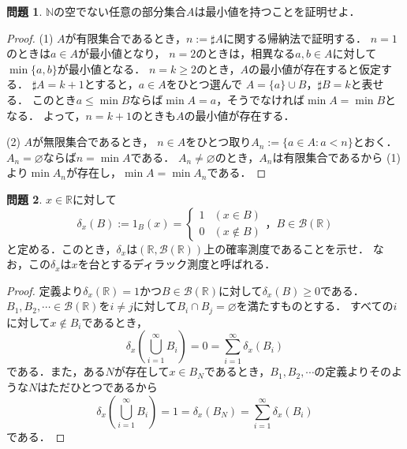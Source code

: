 \documentclass{jsarticle}
\theoremstyle{definition}
\newtheorem{qst}{問題}
\begin{document}
\begin{qst}
$\mathbb{N}$の空でない任意の部分集合$A$は最小値を持つことを証明せよ．
\end{qst}
\begin{proof}
(1)
$A$が有限集合であるとき，$n:=\sharp{A}$に関する帰納法で証明する．
$n=1$のときは$a\in A$が最小値となり，
$n=2$のときは，相異なる$a,b\in A$に対して$\min\{a,b\}$が最小値となる．
$n=k\geq2$のとき，$A$の最小値が存在すると仮定する．
$\sharp{A}=k+1$とすると，$a\in A$をひとつ選んで
$A=\{a\}\cup B$，$\sharp{B}=k$と表せる．
このとき$a\leq\min B$ならば$\min A=a$，そうでなければ$\min A=\min B$となる．
よって，$n=k+1$のときも$A$の最小値が存在する．

(2)
$A$が無限集合であるとき，
$n\in A$をひとつ取り$A_n:=\{a\in A:a<n\}$とおく．
$A_n=\varnothing$ならば$n=\min A$である．
$A_n\neq\varnothing$のとき，$A_n$は有限集合であるから
(1)より$\min A_n$が存在し，$\min A=\min A_n$である．
\end{proof}

\begin{qst}
$x\in\mathbb{R}$に対して
\[ \delta_x(B):=1_B(x)=\begin{cases}1 & (x\in B) \\ 0 & (x\notin B)\end{cases}，B\in\mathcal{B}(\mathbb{R}) \]
と定める．このとき，$\delta_x$は$(\mathbb{R},\mathcal{B}(\mathbb{R}))$上の確率測度であることを示せ．
なお，この$\delta_x$は$x$を台とするディラック測度と呼ばれる．
\end{qst}
\begin{proof}
定義より$\delta_x(\mathbb{R})=1$かつ$B\in\mathcal{B}(\mathbb{R})$に対して$\delta_x(B)\geq0$である．
$B_1,B_2,\cdots\in\mathcal{B}(\mathbb{R})$を$i\neq j$に対して$B_i\cap B_j=\varnothing$を満たすものとする．
すべての$i$に対して$x\notin B_i$であるとき，
\[ \delta_x\left(\bigcup_{i=1}^\infty B_i\right)=0=\sum_{i=1}^\infty\delta_x(B_i) \]
である．また，ある$N$が存在して$x\in B_N$であるとき，$B_1,B_2,\cdots$の定義よりそのような$N$はただひとつであるから
\[ \delta_x\left(\bigcup_{i=1}^\infty B_i\right)=1=\delta_x(B_N)=\sum_{i=1}^\infty\delta_x(B_i) \]
である．
\end{proof}
\end{document}
